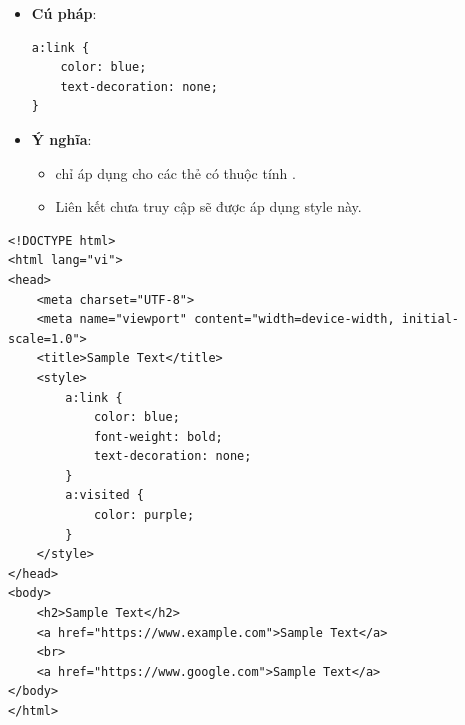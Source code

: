 \begin{conceptBox}
\begin{itemize}[leftmargin=1.5em, itemsep=3pt, parsep=0pt]
    \item \textbf{Cú pháp}:
    \begin{codeWindow}
\begin{lstlisting}[language=CSS3]
a:link {
    color: blue;
    text-decoration: none;
}
\end{lstlisting}
    \end{codeWindow}
    \item \textbf{Ý nghĩa}:
    \begin{itemize}[leftmargin=1.2em, itemsep=2pt]
        \item {} chỉ áp dụng cho các thẻ  có thuộc tính .
        \item Liên kết chưa truy cập sẽ được áp dụng style này.
    \end{itemize}
\end{itemize}
\end{conceptBox}

\begin{codeWindow}
\begin{lstlisting}[language=HTML5]
<!DOCTYPE html>
<html lang="vi">
<head>
    <meta charset="UTF-8">
    <meta name="viewport" content="width=device-width, initial-scale=1.0">
    <title>Sample Text</title>
    <style>
        a:link {
            color: blue;
            font-weight: bold;
            text-decoration: none;
        }
        a:visited {
            color: purple;
        }
    </style>
</head>
<body>
    <h2>Sample Text</h2>
    <a href="https://www.example.com">Sample Text</a>  
    <br>
    <a href="https://www.google.com">Sample Text</a>
</body>
</html>
\end{lstlisting}
\end{codeWindow}

